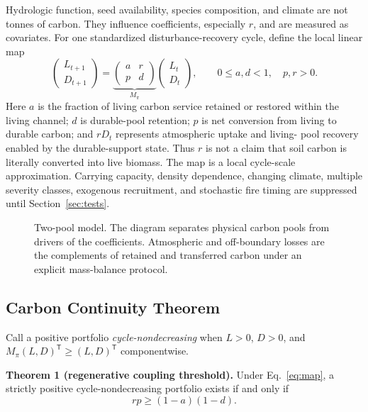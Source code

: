 \documentclass[10pt]{article}
\begin{document}
Hydrologic function, seed availability, species composition, and climate are
not tonnes of carbon.  They influence coefficients, especially $r$, and are
measured as covariates.  For one standardized disturbance-recovery cycle,
define the local linear map
\begin{equation}
\begin{pmatrix}L_{t+1}\\D_{t+1}\end{pmatrix}
=
\underbrace{\begin{pmatrix}a&r\\p&d\end{pmatrix}}_{M_{\pi}}
\begin{pmatrix}L_t\\D_t\end{pmatrix},
\qquad
0\le a,d<1,\quad p,r>0.
\label{eq:map}
\end{equation}
Here $a$ is the fraction of living carbon service retained or restored within
the living channel; $d$ is durable-pool retention; $p$ is net conversion from
living to durable carbon; and $rD_t$ represents atmospheric uptake and living-
pool recovery enabled by the durable-support state.  Thus $r$ is not a claim
that soil carbon is literally converted into live biomass.  The map is a local
cycle-scale approximation.  Carrying capacity, density dependence, changing
climate, multiple severity classes, exogenous recruitment, and stochastic fire
timing are suppressed until Section~\ref{sec:tests}.

\begin{figure}[t]
\centering
\resizebox{0.98\linewidth}{!}{}
\caption{Two-pool model.  The diagram separates physical carbon pools from
drivers of the coefficients.  Atmospheric and off-boundary losses are the
complements of retained and transferred carbon under an explicit mass-balance
protocol.}
\label{fig:system}
\end{figure}

\subsection{Carbon Continuity Theorem}

Call a positive portfolio \emph{cycle-nondecreasing} when $L>0$, $D>0$, and
$M_{\pi}(L,D)^{\mathsf T}\ge(L,D)^{\mathsf T}$ componentwise.

\textbf{Theorem 1 (regenerative coupling threshold).}
Under Eq.~\eqref{eq:map}, a strictly positive cycle-nondecreasing portfolio
exists if and only if
\begin{equation}
rp\ge(1-a)(1-d).
\label{eq:threshold}
\end{equation}
\end{document}
